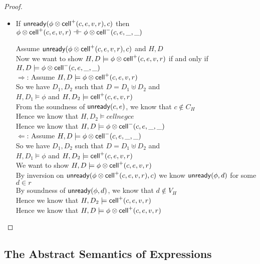 \begin{proof}
\begin{itemize}
\item If $\mathsf{unready}({\phi \otimes \mathsf{cell}^{+}({c}, {e}, {v}, {r})}, {c})$ then $\phi \otimes \mathsf{cell}^{+}({c}, {e}, {v}, {r}) \dashv\vdash \phi \otimes \mathsf{cell}^{-}({c}, {e}, {\_}, {\_})$
\begin{tabbedproof}
\oo Assume $\mathsf{unready}({\phi \otimes \mathsf{cell}^{+}({c}, {e}, {v}, {r})}, {c})$  and $H, D$ \\
\oo Now we want to show $H, D \models \phi \otimes \mathsf{cell}^{+}({c}, {e}, {v}, {r})$ if and only if \\
\ox $H, D \models \phi \otimes \mathsf{cell}^{-}({c}, {e}, {\_}, {\_})$ \\
\oo $\Rightarrow$: Assume $H, D \models \phi \otimes \mathsf{cell}^{+}({c}, {e}, {v}, {r})$ \\
\ooo So we have $D_1, D_2$ such that $D = D_1 \uplus D_2$ and \\
\oox $H, D_1 \models \phi$ and $H, D_2 \models \mathsf{cell}^{+}({c}, {e}, {v}, {r})$ \\
\ooo From the soundness of $\mathsf{unready}({c}, {e})$, we know that $c \not \in C_H$ \\
\ooo Hence we know that $H, D_2 \models cellneg{c}{e}$ \\
\ooo Hence we know that $H, D \models \phi \otimes \mathsf{cell}^{-}({c}, {e}, {\_}, {\_})$ \\
\oo $\Leftarrow$: Assume $H, D \models \phi \otimes \mathsf{cell}^{-}({c}, {e}, {\_}, {\_})$ \\
\ooo So we have $D_1, D_2$ such that $D = D_1 \uplus D_2$ and \\
\oox $H, D_1 \models \phi$ and $H, D_2 \models \mathsf{cell}^{+}({c}, {e}, {v}, {r})$ \\
\ooo We want to show $H, D \models \phi \otimes \mathsf{cell}^{+}({c}, {e}, {v}, {r})$ \\
\ooo By inversion on $\mathsf{unready}({\phi \otimes \mathsf{cell}^{+}({c}, {e}, {v}, {r})}, {c})$ we know $\mathsf{unready}({\phi}, {d})$ for some $d \in r$ \\
\ooo By soundness of $\mathsf{unready}({\phi}, {d})$, we know that $d \not\in V_H$ \\
\ooo Hence we know that $H, D_2 \models \mathsf{cell}^{+}({c}, {e}, {v}, {r})$ \\
\ooo Hence we know that $H, D \models \phi \otimes \mathsf{cell}^{+}({c}, {e}, {v}, {r})$ \\
\end{tabbedproof}
\end{itemize}
\end{proof}



\subsection{The Abstract Semantics of Expressions}

